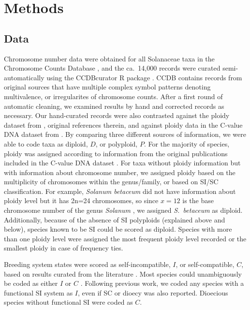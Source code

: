 \section{Methods}

\subsection{Data}


Chromosome number data were obtained for all Solanaceae taxa in the Chromosome Counts Database \citep[CCDB;][]{rice_2015}, and the ca.~14,000 records were curated semi-automatically using the \mbox{CCDBcurator} R package \citep{rivero_2019}.
CCDB contains records from original sources that have multiple complex symbol patterns denoting multivalence, or irregularites of chromosome counts.
After a first round of automatic cleaning, we examined results by hand and corrected records as necessary.
Our hand-curated records were also contrasted against the ploidy dataset from \citet{robertson_2011}, original references therein, and against ploidy data in the C-value DNA dataset from \citet{bennett_2005}.
By comparing three different sources of information, we were able to code taxa as diploid, $D$, or polyploid, $P$.
For the majority of species, ploidy was assigned according to information from the original publications included in the  C-value DNA dataset \citep{bennett_2005}.
For taxa without ploidy information but with information about chromosome number, we assigned ploidy based on the multiplicity of chromosomes within the genus/family, or based on SI/SC classification.
For example, \textit{Solanum betaceum} did not have information about ploidy level but it has 2n=24 chromosomes, so since $x=12$ is the base chromosome number of the genus \textit{Solanum} \citep{olmstead_2007}, we assigned \textit{S.~betaceum} as diploid. 
Additionally, because of the absence of SI polyploids (explained above and below), species known to be SI could be scored as diploid.
Species with more than one ploidy level were assigned the most frequent ploidy level recorded or the smallest ploidy in case of frequency ties.

Breeding system states were scored as self-incompatible, $I$, or self-compatible, $C$, based on results curated from the literature \citep[as compiled in][]{igic_2006, goldberg_2010, robertson_2011, goldberg_2012}. %
Most species could unambiguously be coded as either $I$ or $C$ \citep{raduski_2012}.
Following previous work, we coded any species with a functional SI system as $I$, even if SC or dioecy was also reported.
Dioecious species without functional SI were coded as $C$.

